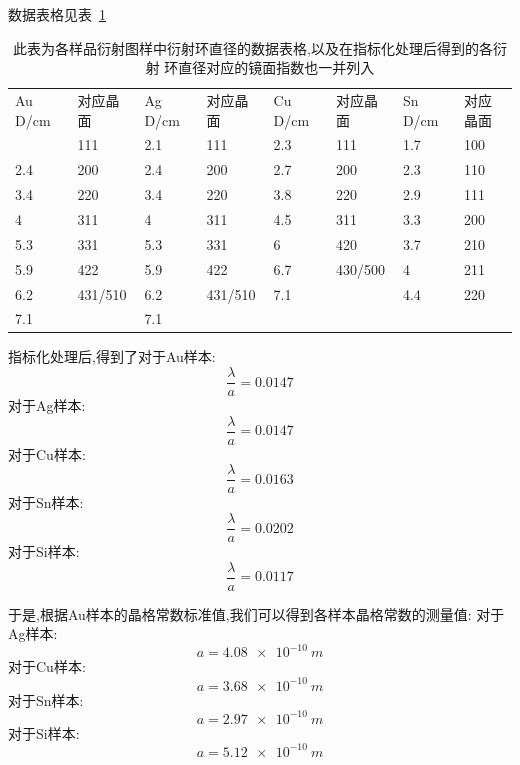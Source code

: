 \documentclass[aps,pre,12pt,preprint,onecolumn,showpacs,showkeys]{revtex4-1}
\begin{document}
数据表格见表~\ref{tab:table1}
\begin{table}[htbp]
  \caption{\label{tab:table1}%
      此表为各样品衍射图样中衍射环直径的数据表格,以及在指标化处理后得到的各衍射
      环直径对应的镜面指数也一并列入}
\begin{ruledtabular}
  \begin{tabular}{llllllll}
      Au D/cm & 对应晶面 & Ag D/cm  & 对应晶面& Cu  
      D/cm & 对应晶面& Sn D/cm & 对应晶面 \\
      \colrule
2.1 & 111 & 2.1 & 111 & 2.3 & 111 & 1.7 & 100 \\ 
2.4 & 200 & 2.4 & 200 & 2.7 & 200 & 2.3 & 110 \\ 
3.4 & 220 & 3.4 & 220 & 3.8 & 220 & 2.9 & 111 \\ 
4 & 311 & 4 & 311 & 4.5 & 311 & 3.3 & 200 \\ 
5.3 & 331 & 5.3 & 331 & 6 & 420 & 3.7 & 210 \\ 
5.9 & 422 & 5.9 & 422 & 6.7 & 430/500 & 4 & 211 \\ 
6.2 & 431/510 & 6.2 & 431/510 & 7.1 &  & 4.4 & 220 \\ 
7.1 &  & 7.1 \\
\end{tabular}
\end{ruledtabular}
\end{table}

指标化处理后,得到了对于Au样本:
\begin{equation}
    \frac{\lambda}{a} = 0.0147 
\end{equation}
对于Ag样本:
\begin{equation}
    \frac{\lambda}{a} = 0.0147
\end{equation}
对于Cu样本:
\begin{equation}
    \frac{\lambda}{a} = 0.0163
\end{equation}
对于Sn样本:
\begin{equation}
    \frac{\lambda}{a} = 0.0202
\end{equation}
对于Si样本:
\begin{equation}
    \frac{\lambda}{a} = 0.0117
\end{equation}

于是,根据Au样本的晶格常数标准值,我们可以得到各样本晶格常数的测量值:
对于Ag样本:
\begin{equation}
    a = \SI{4.08e-10}{m}
\end{equation}
对于Cu样本:
\begin{equation}
    a = \SI{3.68e-10}{m}
\end{equation}
对于Sn样本:
\begin{equation}
    a = \SI{2.97e-10}{m}
\end{equation}
对于Si样本:
\begin{equation}
    a = \SI{5.12e-10}{m}
\end{equation}
\end{document}
